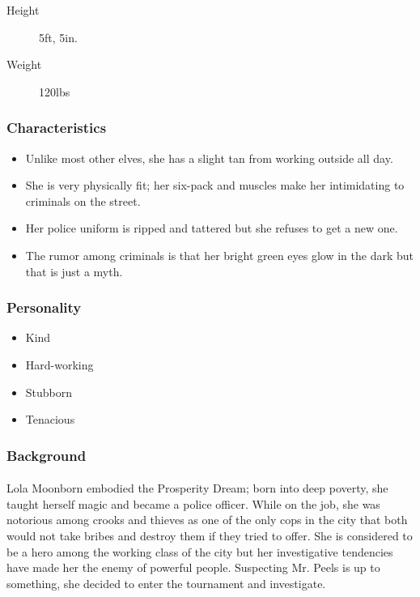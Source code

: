 \begin{description}
    \item[Height] 5ft, 5in.
    \item[Weight] 120lbs
\end{description}

\subsubsection{Characteristics}

\begin{itemize}
    \item Unlike most other elves, she has a slight tan from working outside all day.
    \item She is very physically fit; her six-pack and muscles make her intimidating to criminals on the street.
    \item Her police uniform is ripped and tattered but she refuses to get a new one.
    \item The rumor among criminals is that her bright green eyes glow in the dark but that is just a myth.
\end{itemize}

\subsubsection{Personality}

\begin{itemize}
    \item Kind
    \item Hard-working
    \item Stubborn
    \item Tenacious
\end{itemize}

\subsubsection{Background}

\paragraph{} Lola Moonborn embodied the Prosperity Dream; born into deep poverty, she taught herself magic and became a police officer. While on the job, she was notorious among crooks and thieves as one of the only cops in the city that both would not take bribes and destroy them if they tried to offer. She is considered to be a hero among the working class of the city but her investigative tendencies have made her the enemy of powerful people. Suspecting Mr. Peels is up to something, she decided to enter the tournament and investigate.

